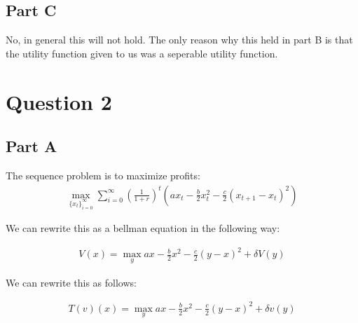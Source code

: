 \documentclass[11pt]{article} %
\begin{document}

\subsection{Part C}

No, in general this will not hold. The only reason why this held in part B is that the utility function given to us was a seperable utility function. 

\section{Question 2}
\subsection{Part A}
The sequence problem is to maximize profits:
\begin{align*}
\max_{\{ x_t\}_{i=0}^{\infty}} \sum_{i=0}^{\infty}\left( \frac{1}{1+r} \right)^{t}\left( ax_t - \frac{b}{2}x_t^2 - \frac{c}{2}(x_{t+1}-x_t)^2\right)
\end{align*}

We can rewrite this as a bellman equation in the following way:

\begin{align}
V(x) =\max_{y} ax - \frac{b}{2}x^2 - \frac{c}{2}(y-x)^2 + \delta V(y) \label{eqn:bell}
\end{align}

We can rewrite this as follows:

\begin{align}
T(v)(x) =\max_{y} ax - \frac{b}{2}x^2 - \frac{c}{2}(y-x)^2 + \delta v(y) \label{eqn:bellT}
\end{align}
\end{document}
